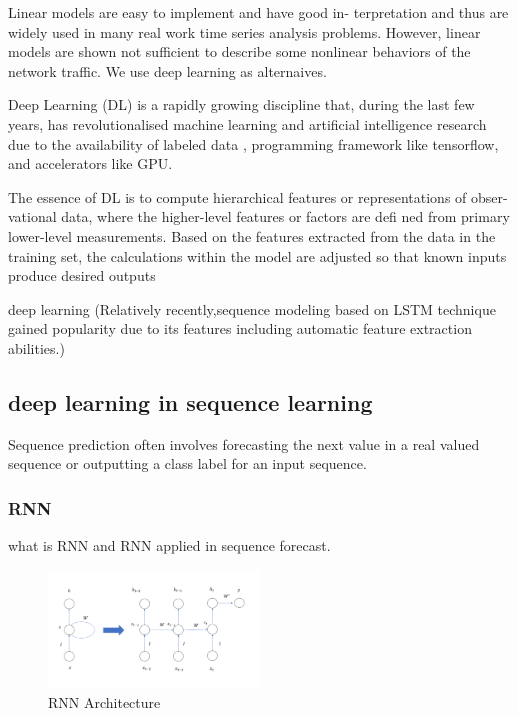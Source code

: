 \documentclass[review]{elsarticle}
\begin{document}
Linear models are easy to implement and have good in-
terpretation and thus are widely used in many real work
time series analysis problems. However, linear models are
shown not sufficient to describe some nonlinear behaviors of
the network traffic. We use deep learning as alternaives.

Deep Learning (DL) is a rapidly growing discipline that, during the last few years, has revolutionalised machine learning and artificial intelligence research due to the availability of labeled data , programming framework like tensorflow, and accelerators like GPU.

 The essence of DL is to compute hierarchical features or representations of obser-vational data, where the higher-level features or factors are defi ned from primary lower-level measurements. Based on the features extracted from the data in the training set, the calculations within the model are adjusted so that known inputs produce desired outputs

deep learning (Relatively recently,sequence modeling based on LSTM technique gained popularity due to its features including automatic feature extraction abilities.\cite{Zhu2017DeepUber})

\subsection{deep learning in sequence learning}
Sequence prediction often involves forecasting the next value in a real valued sequence or outputting a class label for an input sequence.
\
\subsubsection{RNN}
\cite{Bengio1994LearningDifficult}
\cite{ChoLearningTranslation}

what is RNN and RNN applied in sequence forecast.

\begin{figure}[h]
    \centering
    \includegraphics[width=0.5\textwidth]{RNN.png}
    \caption{RNN Architecture}
    \label{fig:RNN}
\end{figure}
\end{document}
